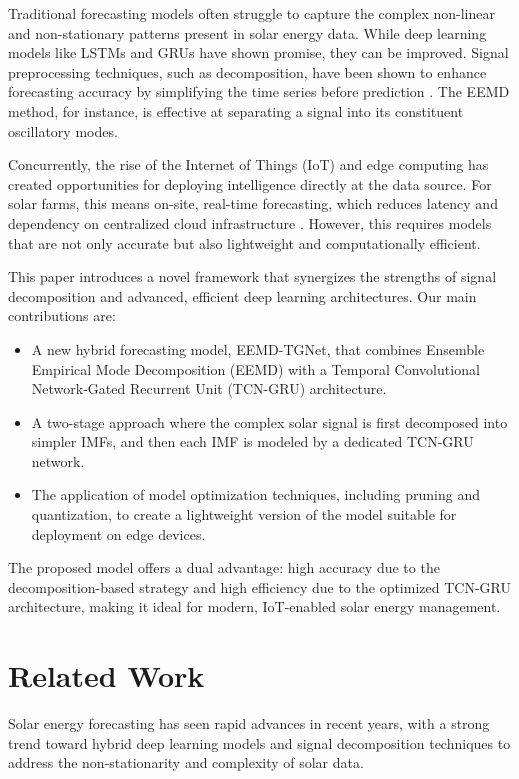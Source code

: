 \documentclass[conference]{IEEEtran}
\begin{document}
Traditional forecasting models often struggle to capture the complex non-linear and non-stationary patterns present in solar energy data. While deep learning models like LSTMs and GRUs have shown promise, they can be improved. Signal preprocessing techniques, such as decomposition, have been shown to enhance forecasting accuracy by simplifying the time series before prediction \cite{b1}. The EEMD method, for instance, is effective at separating a signal into its constituent oscillatory modes.

Concurrently, the rise of the Internet of Things (IoT) and edge computing has created opportunities for deploying intelligence directly at the data source. For solar farms, this means on-site, real-time forecasting, which reduces latency and dependency on centralized cloud infrastructure \cite{b2}. However, this requires models that are not only accurate but also lightweight and computationally efficient.

This paper introduces a novel framework that synergizes the strengths of signal decomposition and advanced, efficient deep learning architectures. Our main contributions are:
\begin{itemize}
    \item A new hybrid forecasting model, EEMD-TGNet, that combines Ensemble Empirical Mode Decomposition (EEMD) with a Temporal Convolutional Network-Gated Recurrent Unit (TCN-GRU) architecture.
    \item A two-stage approach where the complex solar signal is first decomposed into simpler IMFs, and then each IMF is modeled by a dedicated TCN-GRU network.
    \item The application of model optimization techniques, including pruning and quantization, to create a lightweight version of the model suitable for deployment on edge devices.
\end{itemize}

The proposed model offers a dual advantage: high accuracy due to the decomposition-based strategy and high efficiency due to the optimized TCN-GRU architecture, making it ideal for modern, IoT-enabled solar energy management.

\section{Related Work}
Solar energy forecasting has seen rapid advances in recent years, with a strong trend toward hybrid deep learning models and signal decomposition techniques to address the non-stationarity and complexity of solar data.
\end{document}
